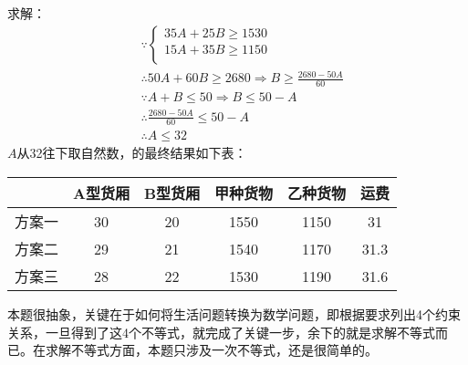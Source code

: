求解：
\begin{align*}
&\because \begin{cases}
	35A+25B\geqslant 1530\\
	15A+35B\geqslant 1150\\
\end{cases} \\
&\therefore 50A+60B\geqslant 2680\Rightarrow B\geqslant \frac{2680-50A}{60} \\
&\because A+B\leqslant 50\Rightarrow B\leqslant 50-A \\
&\therefore \frac{2680-50A}{60}\leqslant 50-A \\
&\therefore A\leqslant 32
\end{align*}
$A$从32往下取自然数，的最终结果如下表：
\begin{table}[h]
\centering
\begin{tabular}{cccccc}
    \toprule
     & A型货厢 & B型货厢 & 甲种货物 & 乙种货物 & 运费\\
    \midrule
    方案一 & 30 & 20 & 1550 & 1150 & 31\\
    方案二 & 29 & 21 & 1540 & 1170 & 31.3\\
    方案三 & 28 & 22 & 1530 & 1190 & 31.6\\
    \bottomrule
\end{tabular}
\end{table}

\begin{tcolorbox}
本题很抽象，关键在于如何将生活问题转换为数学问题，即根据要求列出4个约束关系，一旦得到了这4个不等式，就完成了关键一步，余下的就是求解不等式而已。在求解不等式方面，本题只涉及一次不等式，还是很简单的。
\end{tcolorbox}




